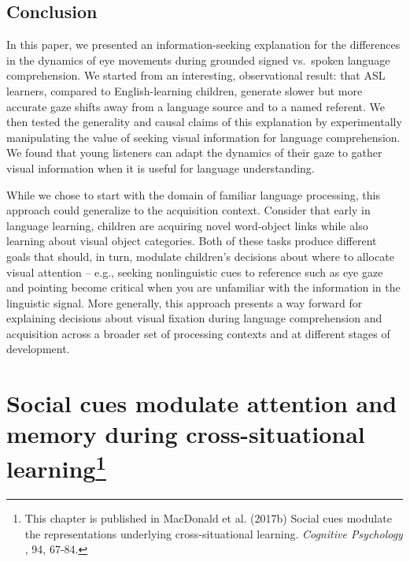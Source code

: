 \documentclass[oneside]{report}
\begin{document}
\section{Conclusion}\label{conclusion-1}

In this paper, we presented an information-seeking explanation for the
differences in the dynamics of eye movements during grounded signed
vs.~spoken language comprehension. We started from an interesting,
observational result: that ASL learners, compared to English-learning
children, generate slower but more accurate gaze shifts away from a
language source and to a named referent. We then tested the generality
and causal claims of this explanation by experimentally manipulating the
value of seeking visual information for language comprehension. We found
that young listeners can adapt the dynamics of their gaze to gather
visual information when it is useful for language understanding.

While we chose to start with the domain of familiar language processing,
this approach could generalize to the acquisition context. Consider that
early in language learning, children are acquiring novel word-object
links while also learning about visual object categories. Both of these
tasks produce different goals that should, in turn, modulate children's
decisions about where to allocate visual attention -- e.g., seeking
nonlinguistic cues to reference such as eye gaze and pointing become
critical when you are unfamiliar with the information in the linguistic
signal. More generally, this approach presents a way forward for
explaining decisions about visual fixation during language comprehension
and acquisition across a broader set of processing contexts and at
different stages of development.

\chapter[Social cues modulate attention and memory during
cross-situational learning]{\texorpdfstring{Social cues modulate
attention and memory during cross-situational learning\footnote{This
  chapter is published in MacDonald et al. (2017b) Social cues modulate
  the representations underlying cross-situational learning.
  \emph{Cognitive Psychology }, 94, 67-84.}}{Social cues modulate attention and memory during cross-situational learning}}\label{social-cues-modulate-attention-and-memory-during-cross-situational-learning}

\end{document}
